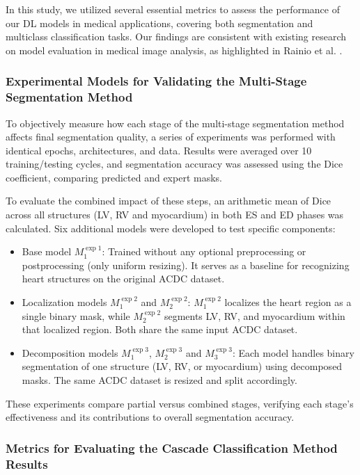 \documentclass[fleqn,10pt]{wlscirep}
\begin{document}
In this study, we utilized several essential metrics to assess the performance of our DL models in medical applications, covering both segmentation and multiclass classification tasks. Our findings are consistent with existing research on model evaluation in medical image analysis, as highlighted in Rainio et al. \cite{Rainio:2024}.

\subsubsection*{Experimental Models for Validating the Multi-Stage Segmentation Method}

To objectively measure how each stage of the multi-stage segmentation method affects final segmentation quality, a series of experiments was performed with identical epochs, architectures, and data. Results were averaged over 10 training/testing cycles, and segmentation accuracy was assessed using the Dice coefficient, comparing predicted and expert masks.

To evaluate the combined impact of these steps, an arithmetic mean of Dice across all structures (LV, RV and myocardium) in both ES and ED phases was calculated. Six additional models were developed to test specific components:

\begin{itemize}
    \item Base model \(M_1^{\exp 1}\): Trained without any optional preprocessing or postprocessing (only uniform resizing). It serves as a baseline for recognizing heart structures on the original ACDC dataset.
    \item Localization models \(M_1^{\exp 2}\) and \(M_2^{\exp 2}\): \(M_1^{\exp 2}\) localizes the heart region as a single binary mask, while \(M_2^{\exp 2}\) segments LV, RV, and myocardium within that localized region. Both share the same input ACDC dataset.
    \item Decomposition models \(M_1^{\exp 3}\), \(M_2^{\exp 3}\) and \(M_3^{\exp 3}\): Each model handles binary segmentation of one structure (LV, RV, or myocardium) using decomposed masks. The same ACDC dataset is resized and split accordingly.
\end{itemize}

These experiments compare partial versus combined stages, verifying each stage's effectiveness and its contributions to overall segmentation accuracy.

\subsubsection*{Metrics for Evaluating the Cascade Classification Method Results}
\end{document}
